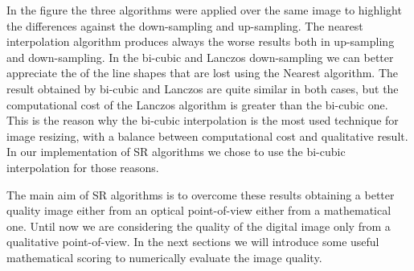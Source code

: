 \documentclass{standalone}
\begin{document}
In the figure the three algorithms were applied over the same image to highlight the differences against the down-sampling and up-sampling.
The nearest interpolation algorithm produces always the worse results both in up-sampling and down-sampling.
In the bi-cubic and Lanczos down-sampling we can better appreciate the  of the line shapes that are lost using the Nearest algorithm.
The result obtained by bi-cubic and Lanczos are quite similar in both cases, but the computational cost of the Lanczos algorithm is greater than the bi-cubic one.
This is the reason why the bi-cubic interpolation is the most used technique for image resizing, with a balance between computational cost and qualitative result.
In our implementation of SR algorithms we chose to use the bi-cubic interpolation for those reasons.

The main aim of SR algorithms is to overcome these results obtaining a better quality image either from an optical point-of-view either from a mathematical one.
Until now we are considering the quality of the digital image only from a qualitative point-of-view.
In the next sections we will introduce some useful mathematical scoring to numerically evaluate the image quality.
\end{document}
